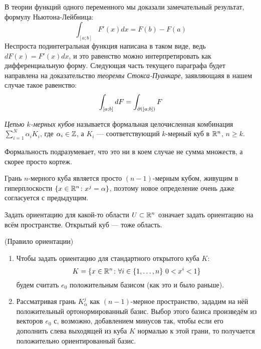 \begin{note}
	В теории функций одного переменного мы доказали замечательный результат, формулу Ньютона-Лейбница:
	\[
		\int_{[a; b]} F'(x)dx = F(b) - F(a)
	\]
	Неспроста подинтегральная функция написана в таком виде, ведь $dF(x) = F'(x)dx$, и это равенство можно интерпретировать как дифференциальную форму. Следующая часть текущего параграфа будет направлена на доказательство \textit{теоремы Стокса-Пуанкаре}, заявляющаяя в нашем случае такое равенство:
	\[
		\int_{[a; b]} dF = \int_{\partial([a; b])} F
	\]
\end{note}

\begin{definition}
	\textit{Цепью $k$-мерных кубов} называется формальная целочисленная комбинация $\sum_{i = 1}^N \alpha_i K_i$, где $\alpha_i \in \mathbb{Z}$, а $K_i$ --- соответствующий $k$-мерный куб в $\mathbb{R}^n$, $n \ge k$.
\end{definition}

\begin{anote}
	Формальность подразумевает, что это ни в коем случае не сумма множеств, а скорее просто кортеж.
\end{anote}

\begin{note}
	Грань $n$-мерного куба является просто $(n - 1)$-мерным кубом, живущим в гиперплоскости $\{x \in \mathbb{R}^n \colon x^j = \alpha\}$, поэтому новое определение очень даже согласуется с предыдущим.
\end{note}

\begin{anote}
	Задать ориентацию для какой-то области $U \subset \mathbb{R}^n$ означает задать ориентацию на всём пространстве. Открытый куб --- тоже область.
\end{anote}

\begin{definition} (Правило ориентации)
	\begin{enumerate}
		\item Чтобы задать ориентацию для стандартного открытого куба $K$:
		\[
			K = \{x \in \mathbb{R}^n \colon \forall i \in \{1, \ldots, n\}\ 0 < x^i < 1\}
		\]
		будем считать $e_0$ положительным базисом (как это и было раньше).
		
		\item Рассматривая грань $K_\alpha^j$ как $(n - 1)$-мерное пространство, зададим на нёй положительный ортонормированный базис. Выбор этого базиса произведём из векторов $e_0$ с, возможно, добавлением минусов так, чтобы если его дополнить слева выходящей из куба $K$ нормалью к этой грани, то получается положительно ориентированный базис.
	\end{enumerate}
\end{definition}

